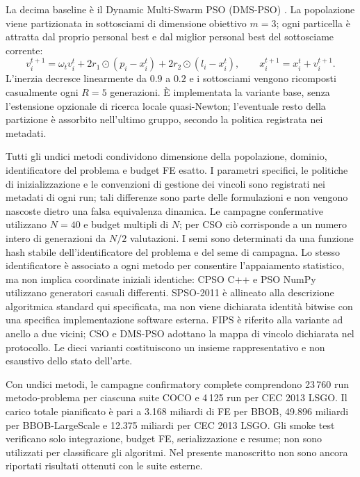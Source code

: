 La decima baseline è il Dynamic Multi-Swarm PSO (DMS-PSO)
\citep{LiangSuganthan2005DMS}. La popolazione viene partizionata in
sottosciami di dimensione obiettivo $m=3$; ogni particella è attratta dal
proprio personal best e dal miglior personal best del sottosciame corrente:
\begin{equation}
 v_i^{t+1}=\omega_t v_i^t+2r_1\odot(p_i-x_i^t)
 +2r_2\odot(l_i-x_i^t),\qquad x_i^{t+1}=x_i^t+v_i^{t+1}.
 \label{eq:dms-update}
\end{equation}
L'inerzia decresce linearmente da $0.9$ a $0.2$ e i sottosciami vengono
ricomposti casualmente ogni $R=5$ generazioni. È implementata la variante base,
senza l'estensione opzionale di ricerca locale quasi-Newton; l'eventuale resto
della partizione è assorbito nell'ultimo gruppo, secondo la politica registrata
nei metadati.

Tutti gli undici metodi condividono dimensione della popolazione, dominio,
identificatore del problema e budget FE esatto. I parametri specifici, le
politiche di inizializzazione e le convenzioni di gestione dei vincoli sono
registrati nei metadati di ogni run; tali differenze sono parte delle
formulazioni e non vengono nascoste dietro una falsa equivalenza dinamica.
Le campagne confermative utilizzano $N=40$ e budget multipli di $N$; per CSO
ciò corrisponde a un numero intero di generazioni da $N/2$ valutazioni. I semi
sono determinati da una funzione hash stabile dell'identificatore del problema
e del seme di campagna. Lo stesso identificatore è associato a ogni metodo per
consentire l'appaiamento statistico, ma non implica coordinate iniziali
identiche: CPSO C++ e PSO NumPy utilizzano generatori casuali differenti.
SPSO-2011 è allineato alla descrizione algoritmica standard qui specificata,
ma non viene dichiarata identità bitwise con una specifica implementazione
software esterna. FIPS è riferito alla variante ad anello a due vicini; CSO e
DMS-PSO adottano la mappa di vincolo dichiarata nel protocollo. Le dieci
varianti costituiscono un insieme rappresentativo e non esaustivo dello stato
dell'arte.

Con undici metodi, le campagne confirmatory complete comprendono 23\,760
run metodo-problema per ciascuna suite COCO e 4\,125 run per CEC 2013 LSGO.
Il carico totale pianificato è pari a 3.168 miliardi di FE per BBOB, 49.896
miliardi per BBOB-LargeScale e 12.375 miliardi per CEC 2013 LSGO. Gli smoke
test verificano solo integrazione, budget FE, serializzazione e resume; non
sono utilizzati per classificare gli algoritmi. Nel presente manoscritto non
sono ancora riportati risultati ottenuti con le suite esterne.
